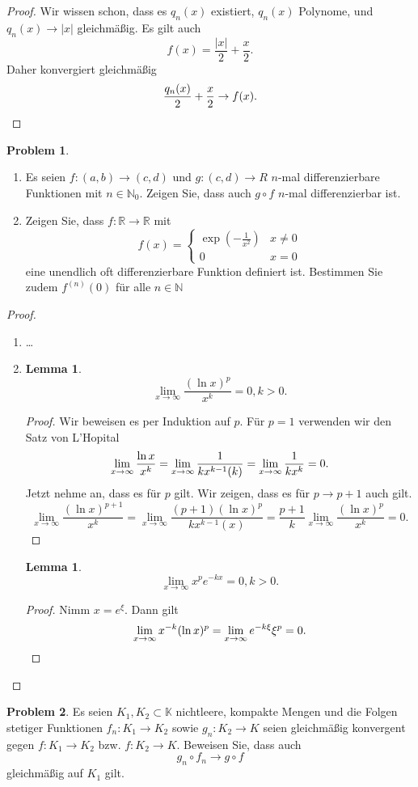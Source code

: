 \documentclass[prb,12pt]{revtex4-2}
\newtheorem{Lemma}[Theorem]{Lemma}
\theoremstyle{definition}
\newtheorem{Problem}{Problem}
\theoremstyle{definition}
\newcommand{\N}{\mathbb{N}}
\newcommand{\R}{\mathbb{R}}
\begin{document}
\begin{proof}
	Wir wissen schon, dass es $q_n(x)$ existiert, $q_n(x)$ Polynome, und $q_n(x)\to |x|$ gleichmäßig. Es gilt auch
	\[
	f(x)=\frac{|x|}{2}+\frac{x}{2}
	.\] 
	Daher konvergiert gleichmäßig
	\[
		\frac{q_n(x)}{2}+\frac{x}{2}\to f(x)
	.\qedhere\] 
\end{proof}
\begin{Problem}
\begin{enumerate}[label=\roman*)]
	\item  Es seien $f : (a, b) \to (c, d)$ und $g : (c, d) \to  R$  $n$-mal differenzierbare Funktionen mit $n \in \N_0$. Zeigen Sie, dass auch $g \circ f$ $n$-mal differenzierbar ist.  
	\item Zeigen Sie, dass $f : \R \to \R$ mit
		\[
		f(x)=\begin{cases}
			\exp\left( -\frac{1}{x^2} \right) & x\neq 0\\
			0 & x = 0 
		\end{cases}
		\]
		eine unendlich oft differenzierbare Funktion definiert ist. Bestimmen Sie zudem $f^{(n)}(0)$ für alle $n\in \N$
\end{enumerate}	
\end{Problem}
\begin{proof}
	\begin{enumerate}[label=\roman*)]
		\item \ldots
		\item 
			\begin{Lemma}
				\[
				\lim_{x \to \infty} \frac{(\ln x)^p}{x^k}=0, k > 0
				.\] 
			\end{Lemma}
			\begin{proof}
				Wir beweisen es per Induktion auf $p$. F\"{u}r $p=1$ verwenden wir den Satz von L'Hopital
				\[
					\lim_{x \to \infty} \frac{\ln x}{x^k}=\lim_{x \to \infty} \frac{1}{kx^{k-1}(k)}=\lim_{x \to \infty} \frac{1}{kx^k}=0
				.\qedhere\] 
				Jetzt nehme an, dass es f\"{u}r $p$ gilt. Wir zeigen, dass es f\"{u}r $p\to p+1$ auch gilt. 
				\[
					\lim_{x \to \infty} \frac{(\ln x)^{p+1}}{x^k}=\lim_{x \to \infty} \frac{(p+1)(\ln x)^p}{kx^{k-1}(x)}=\frac{p+1}{k}\lim_{x \to \infty} \frac{(\ln x)^p}{x^k}=0
				.\] 
			\end{proof}
			\begin{Lemma}
			\[
				\lim_{x \to \infty} x^p e^{-kx}=0, k>0
			.\] 	
			\end{Lemma}
			\begin{proof}
				Nimm $x=e^\xi$. Dann gilt
				\[
					\lim_{x \to \infty} x^{-k}(\ln x)^p=\lim_{x \to \infty} e^{-k\xi}\xi^p=0
				.\qedhere\] 
			\end{proof}
	\end{enumerate}
\end{proof}
\begin{Problem}
	Es seien $K_1 , K_2 \subset \mathbb{K}$  nichtleere, kompakte Mengen und die Folgen stetiger Funktionen $f_n : K_1 \to K_2$ sowie $g_n : K_2 \to K$  seien gleichmäßig konvergent gegen $f : K_1 \to K_2$ bzw. $f : K_2 \to K$. Beweisen Sie, dass auch
	\[
	g_n\circ f_n \to g \circ f\]
	gleichmäßig auf $K_1$ gilt.
\end{Problem}
\end{document}
